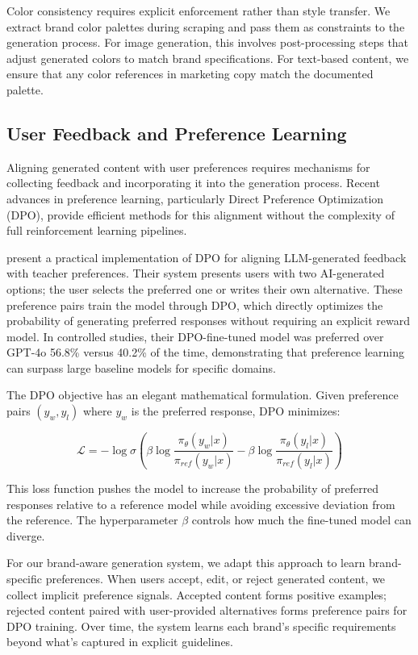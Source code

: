 \documentclass[11pt, twocolumn]{article}
\begin{document}
Color consistency requires explicit enforcement rather than style transfer. We extract brand color palettes during scraping and pass them as constraints to the generation process. For image generation, this involves post-processing steps that adjust generated colors to match brand specifications. For text-based content, we ensure that any color references in marketing copy match the documented palette.

\subsection{User Feedback and Preference Learning}

Aligning generated content with user preferences requires mechanisms for collecting feedback and incorporating it into the generation process. Recent advances in preference learning, particularly Direct Preference Optimization (DPO), provide efficient methods for this alignment without the complexity of full reinforcement learning pipelines.

\cite{Woodrow2025} present a practical implementation of DPO for aligning LLM-generated feedback with teacher preferences. Their system presents users with two AI-generated options; the user selects the preferred one or writes their own alternative. These preference pairs train the model through DPO, which directly optimizes the probability of generating preferred responses without requiring an explicit reward model. In controlled studies, their DPO-fine-tuned model was preferred over GPT-4o 56.8\% versus 40.2\% of the time, demonstrating that preference learning can surpass large baseline models for specific domains.

The DPO objective has an elegant mathematical formulation. Given preference pairs $(y_w, y_l)$ where $y_w$ is the preferred response, DPO minimizes:

\begin{equation}
\mathcal{L} = -\log \sigma\left(\beta \log \frac{\pi_\theta(y_w|x)}{\pi_{ref}(y_w|x)} - \beta \log \frac{\pi_\theta(y_l|x)}{\pi_{ref}(y_l|x)}\right)
\end{equation}

This loss function pushes the model to increase the probability of preferred responses relative to a reference model while avoiding excessive deviation from the reference. The hyperparameter $\beta$ controls how much the fine-tuned model can diverge.

For our brand-aware generation system, we adapt this approach to learn brand-specific preferences. When users accept, edit, or reject generated content, we collect implicit preference signals. Accepted content forms positive examples; rejected content paired with user-provided alternatives forms preference pairs for DPO training. Over time, the system learns each brand's specific requirements beyond what's captured in explicit guidelines.
\end{document}
